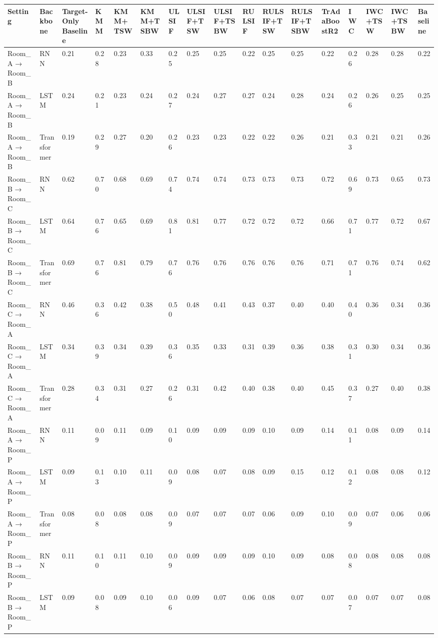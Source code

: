 \begin{tabular}{lllllllllllllllll}
\toprule
Setting & Backbone & Target-Only Baseline & KMM & KMM+TSW & KMM+TSBW & ULSIF & ULSIF+TSW & ULSIF+TSBW & RULSIF & RULSIF+TSW & RULSIF+TSBW & TrAdaBoostR2 & IWC & IWC+TSW & IWC+TSBW & Baseline \\
\midrule
Room_A → Room_B & RNN & 0.21 & 0.28 & 0.23 & 0.33 & 0.25 & 0.25 & 0.25 & 0.22 & 0.25 & 0.25 & 0.22 & 0.26 & 0.28 & 0.28 & 0.22 \\
Room_A → Room_B & LSTM & 0.24 & 0.21 & 0.23 & 0.24 & 0.27 & 0.24 & 0.27 & 0.27 & 0.24 & 0.28 & 0.24 & 0.26 & 0.26 & 0.25 & 0.25 \\
Room_A → Room_B & Transformer & 0.19 & 0.29 & 0.27 & 0.20 & 0.26 & 0.23 & 0.23 & 0.22 & 0.22 & 0.26 & 0.21 & 0.33 & 0.21 & 0.21 & 0.26 \\
Room_B → Room_C & RNN & 0.62 & 0.70 & 0.68 & 0.69 & 0.74 & 0.74 & 0.74 & 0.73 & 0.73 & 0.73 & 0.72 & 0.69 & 0.73 & 0.65 & 0.73 \\
Room_B → Room_C & LSTM & 0.64 & 0.76 & 0.65 & 0.69 & 0.81 & 0.81 & 0.77 & 0.72 & 0.72 & 0.72 & 0.66 & 0.71 & 0.77 & 0.72 & 0.67 \\
Room_B → Room_C & Transformer & 0.69 & 0.76 & 0.81 & 0.79 & 0.76 & 0.76 & 0.76 & 0.76 & 0.76 & 0.76 & 0.71 & 0.71 & 0.76 & 0.74 & 0.62 \\
Room_C → Room_A & RNN & 0.46 & 0.36 & 0.42 & 0.38 & 0.50 & 0.48 & 0.41 & 0.43 & 0.37 & 0.40 & 0.40 & 0.40 & 0.36 & 0.34 & 0.36 \\
Room_C → Room_A & LSTM & 0.34 & 0.39 & 0.34 & 0.39 & 0.36 & 0.35 & 0.33 & 0.31 & 0.39 & 0.36 & 0.38 & 0.31 & 0.30 & 0.34 & 0.36 \\
Room_C → Room_A & Transformer & 0.28 & 0.34 & 0.31 & 0.27 & 0.26 & 0.31 & 0.42 & 0.40 & 0.38 & 0.40 & 0.45 & 0.37 & 0.27 & 0.40 & 0.38 \\
Room_A → Room_P & RNN & 0.11 & 0.09 & 0.11 & 0.09 & 0.10 & 0.09 & 0.09 & 0.09 & 0.10 & 0.09 & 0.14 & 0.11 & 0.08 & 0.09 & 0.14 \\
Room_A → Room_P & LSTM & 0.09 & 0.13 & 0.10 & 0.11 & 0.09 & 0.08 & 0.07 & 0.08 & 0.09 & 0.15 & 0.12 & 0.12 & 0.08 & 0.08 & 0.12 \\
Room_A → Room_P & Transformer & 0.08 & 0.08 & 0.08 & 0.08 & 0.09 & 0.07 & 0.07 & 0.07 & 0.06 & 0.09 & 0.10 & 0.09 & 0.07 & 0.06 & 0.06 \\
Room_B → Room_P & RNN & 0.11 & 0.10 & 0.11 & 0.10 & 0.09 & 0.09 & 0.09 & 0.09 & 0.10 & 0.09 & 0.08 & 0.08 & 0.08 & 0.08 & 0.08 \\
Room_B → Room_P & LSTM & 0.09 & 0.08 & 0.09 & 0.10 & 0.06 & 0.09 & 0.07 & 0.06 & 0.08 & 0.07 & 0.07 & 0.07 & 0.07 & 0.07 & 0.08 \\

\end{tabular}
